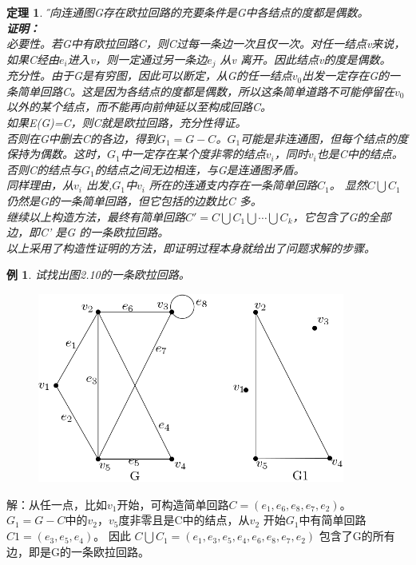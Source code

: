 \documentclass[11pt,a4paper,openany]{book}
\newtheorem{theorem}{\textbf{定理}}[section]
\newtheorem{sample}{\textbf{例}}[section]
\begin{document}
\begin{theorem}\H
无向连通图G存在欧拉回路的充要条件是G中各结点的度都是偶数。\\
\textbf{证明：}\\
必要性。若G中有欧拉回路C，则C过每一条边一次且仅一次。对任一结点v来说，如果C经由$e_i$进入v，则一定通过另一条边$e_j$ 从v 离开。因此结点v的度是偶数。\\
充分性。由于G是有穷图，因此可以断定，从G的任一结点$v_0$出发一定存在G的一条简单回路C。这是因为各结点的度都是偶数，所以这条简单道路不可能停留在$v_0$以外的某个结点，而不能再向前伸延以至构成回路C。\\
如果E(G)=C，则C就是欧拉回路，充分性得证。\\
否则在G中删去C的各边，得到$G_1=G-C$。$G_1$可能是非连通图，但每个结点的度保持为偶数。这时，$G_1$中一定存在某个度非零的结点$v_i$，同时$v_i$也是C中的结点。否则C的结点与$G_1$的结点之间无边相连，与G是连通图矛盾。\\
同样理由，从$v_i$ 出发,$G_1$中$v_i$ 所在的连通支内存在一条简单回路$C_1$。 显然$C\bigcup C_1$ 仍然是G的一条简单回路，但它包括的边数比C 多。\\
继续以上构造方法，最终有简单回路$C'=C\bigcup C_1\bigcup\cdots\bigcup C_k$，它包含了G的全部边，即C' 是G 的一条欧拉回路。\\
以上采用了构造性证明的方法，即证明过程本身就给出了问题求解的步骤。\\
\end{theorem}
\begin{sample}\K
试找出图2.10的一条欧拉回路。
\end{sample}
\begin{figure}[h]
  \centering
  \includegraphics[width=0.9\textwidth]{2.10.png}\\
  \caption{}
\end{figure}
\indent 解：从任一点，比如$v_1$开始，可构造简单回路$C=(e_1,e_6,e_8,e_7,e_2)$。$G_1  =G-C$中的$v_2，v_5$度非零且是C中的结点，从$v_2$ 开始$G_1$中有简单回路$C1=(e_3,e_5,e_4)$。 因此 $C\bigcup C_1=(e_1,e_3,e_5,e_4,e_6,e_8,e_7,e_2)$ 包含了G的所有边，即是G的一条欧拉回路。
\end{document}
